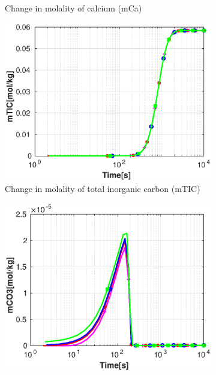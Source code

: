 \begin{figure}[!h]
\begin{subfigure}{.5\linewidth}
        \caption{Change in molality of calcium (mCa)}
        \label{fig:pHmCa}
    \end{subfigure}%
    \hfill
    \begin{subfigure}{.5\linewidth}
            \centering
        \includegraphics[width=\textwidth]{PICTURES/with_pH_mTIC.eps}
        \caption{Change in molality of total inorganic carbon (mTIC)}
        \label{fig:pHmTIC}
    \end{subfigure}%
    \hfill
    \begin{subfigure}{.5\linewidth}
            \centering
        \includegraphics[width=\textwidth]{PICTURES/with_pH_mCO3.eps}

\end{subfigure}
\end{figure}
